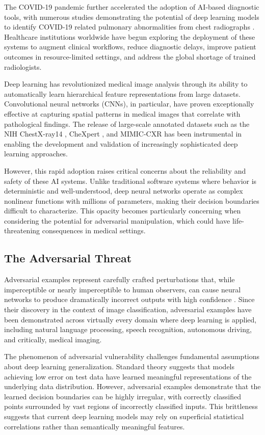 \documentclass[12pt,a4paper]{article}
\begin{document}
The COVID-19 pandemic further accelerated the adoption of AI-based diagnostic tools, with numerous studies demonstrating the potential of deep learning models to identify COVID-19 related pulmonary abnormalities from chest radiographs \cite{roberts2021}. Healthcare institutions worldwide have begun exploring the deployment of these systems to augment clinical workflows, reduce diagnostic delays, improve patient outcomes in resource-limited settings, and address the global shortage of trained radiologists.

Deep learning has revolutionized medical image analysis through its ability to automatically learn hierarchical feature representations from large datasets. Convolutional neural networks (CNNs), in particular, have proven exceptionally effective at capturing spatial patterns in medical images that correlate with pathological findings. The release of large-scale annotated datasets such as the NIH ChestX-ray14 \cite{wang2017}, CheXpert \cite{irvin2019}, and MIMIC-CXR \cite{johnson2019} has been instrumental in enabling the development and validation of increasingly sophisticated deep learning approaches.

However, this rapid adoption raises critical concerns about the reliability and safety of these AI systems. Unlike traditional software systems where behavior is deterministic and well-understood, deep neural networks operate as complex nonlinear functions with millions of parameters, making their decision boundaries difficult to characterize. This opacity becomes particularly concerning when considering the potential for adversarial manipulation, which could have life-threatening consequences in medical settings.

\subsection{The Adversarial Threat}

Adversarial examples represent carefully crafted perturbations that, while imperceptible or nearly imperceptible to human observers, can cause neural networks to produce dramatically incorrect outputs with high confidence \cite{szegedy2014}. Since their discovery in the context of image classification, adversarial examples have been demonstrated across virtually every domain where deep learning is applied, including natural language processing, speech recognition, autonomous driving, and critically, medical imaging.

The phenomenon of adversarial vulnerability challenges fundamental assumptions about deep learning generalization. Standard theory suggests that models achieving low error on test data have learned meaningful representations of the underlying data distribution. However, adversarial examples demonstrate that the learned decision boundaries can be highly irregular, with correctly classified points surrounded by vast regions of incorrectly classified inputs. This brittleness suggests that current deep learning models may rely on superficial statistical correlations rather than semantically meaningful features.
\end{document}
